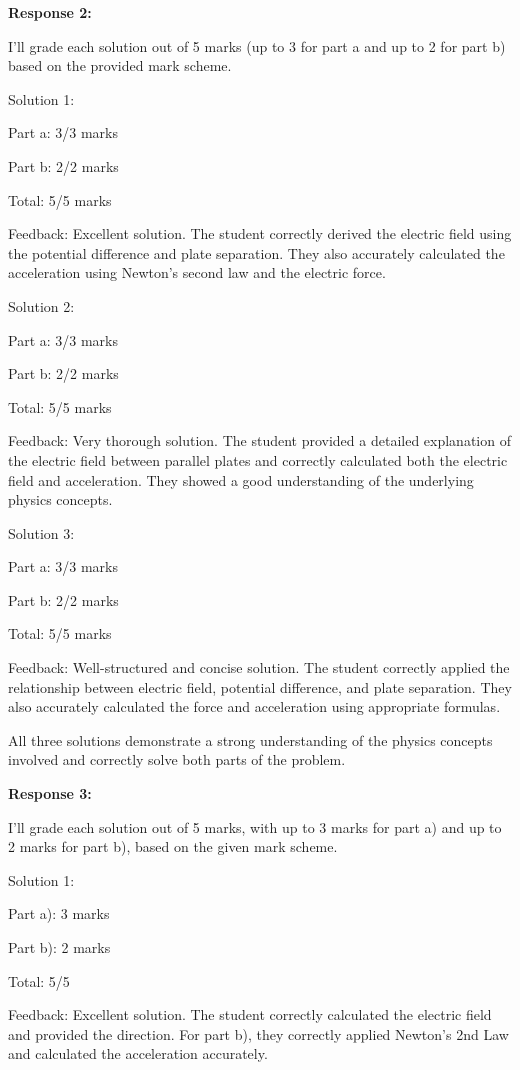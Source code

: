 \documentclass[a4paper,11pt]{article}
\begin{document}
\bigskip
\textbf{Response 2:}

I'll grade each solution out of 5 marks (up to 3 for part a and up to 2 for part b) based on the provided mark scheme.

Solution 1:

Part a: 3/3 marks

Part b: 2/2 marks

Total: 5/5 marks

Feedback: Excellent solution. The student correctly derived the electric field using the potential difference and plate separation. They also accurately calculated the acceleration using Newton's second law and the electric force.

Solution 2:

Part a: 3/3 marks

Part b: 2/2 marks

Total: 5/5 marks

Feedback: Very thorough solution. The student provided a detailed explanation of the electric field between parallel plates and correctly calculated both the electric field and acceleration. They showed a good understanding of the underlying physics concepts.

Solution 3:

Part a: 3/3 marks

Part b: 2/2 marks

Total: 5/5 marks

Feedback: Well-structured and concise solution. The student correctly applied the relationship between electric field, potential difference, and plate separation. They also accurately calculated the force and acceleration using appropriate formulas.

All three solutions demonstrate a strong understanding of the physics concepts involved and correctly solve both parts of the problem.

\bigskip
\textbf{Response 3:}

I'll grade each solution out of 5 marks, with up to 3 marks for part a) and up to 2 marks for part b), based on the given mark scheme.

Solution 1:

Part a): 3 marks

Part b): 2 marks

Total: 5/5

Feedback: Excellent solution. The student correctly calculated the electric field and provided the direction. For part b), they correctly applied Newton's 2nd Law and calculated the acceleration accurately.
\end{document}
